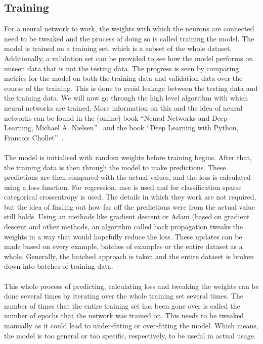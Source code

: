 \documentclass[12pt]{article}
\begin{document}
\subsection{Training}\label{subsec:training}
For a neural network to work, the weights with which the neurons are connected need to be tweaked and the process of doing so is called training the model. The model is trained on a training set, which is a subset of the whole dataset. Additionally, a validation set can be provided to see how the model performs on unseen data that is not the testing data. The progress is seen by comparing metrics for the model on both the training data and validation data over the course of the training. This is done to avoid leakage between the testing data and the training data. We will now go through the high level algorithm with which neural networks are trained. More information on this and the idea of neural networks can be found in the (online) book ``Neural Networks and Deep Learning, Michael A. Nielsen''~\cite{neuralnets} and the book ``Deep Learning with Python, Francois Chollet''~\cite{deeplearning}.
\\\\
The model is initialised with random weights before training begins. After that, the training data is then through the model to make predictions. These predictions are then compared with the actual values, and the loss is calculated using a loss function. For regression, mse is used and for classification sparse categorical crossentropy is used. The details in which they work are not required, but the idea of finding out how far off the predictions were from the actual value still holds. Using an methods like gradient descent or Adam (based on gradient descent and other methods, an algorithm called back propagation tweaks the weights in a way that would hopefully reduce the loss. These updates can be made based on every example, batches of examples or the entire dataset as a whole. Generally, the batched approach is taken and the entire dataset is broken down into batches of training data. 
\\\\
This whole process of predicting, calculating loss and tweaking the weights can be done several times by iterating over the whole training set several times. The number of times that the entire training set has been gone over is called the number of epochs that the network was trained on. This needs to be tweaked manually as it could lead to under-fitting or over-fitting the model. Which means, the model is too general or too specific, respectively, to be useful in actual usage.
\end{document}
